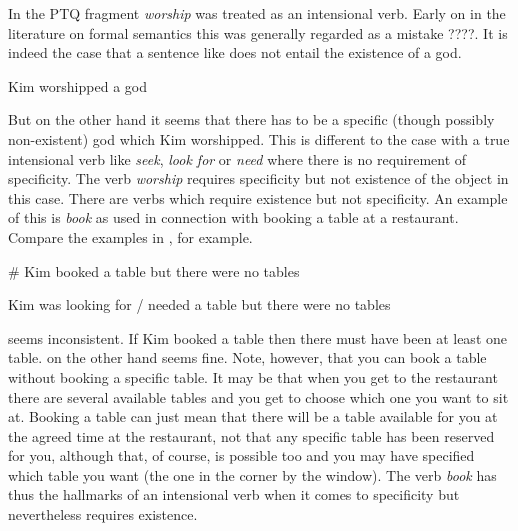 In the PTQ fragment \citep{Montague1973} \textit{worship} was treated
as an intensional verb.  Early on in the literature on formal
semantics this was generally regarded as a mistake \citep{Bennett1974}
????.  It is indeed the case that a sentence like \nexteg{} does not
entail the existence of a god.
\begin{ex} 
Kim worshipped a god 
\end{ex} 
But on the other hand it seems that there has to be a specific (though
possibly non-existent) god which Kim worshipped.  This is different to
the case with a true intensional verb like \textit{seek},
\textit{look for} or \textit{need} where there is no requirement of
specificity.  The verb \textit{worship} requires
specificity but not existence of the object in this case.  There are
verbs which require existence but not specificity.  An example of this
is \textit{book} as used in connection with booking a table at a
restaurant.  Compare the examples in \nexteg{}, for example.
\begin{ex} 
\begin{subex} 
 
\item \# Kim booked a table but there were no tables 
 
\item Kim was looking for / needed a table but there were no tables 
 
\end{subex} 
   
\end{ex} 
 seems inconsistent.  If Kim booked a table then there must
have been at least one table.   on the other hand seems
fine.  Note, however, that you can book a table without booking a
specific table.  It may be that when you get to the restaurant there
are several available tables and you get to choose which one you want
to sit at.  Booking a table can just mean that there will be a table
available for you at the agreed time at the restaurant, not that any
specific table has been reserved for you, although that, of course, is
possible too and you may have specified which table you want (the
one in the corner by the window).  The verb \textit{book} has thus the
hallmarks of an intensional verb when it comes to specificity but
nevertheless requires existence.

